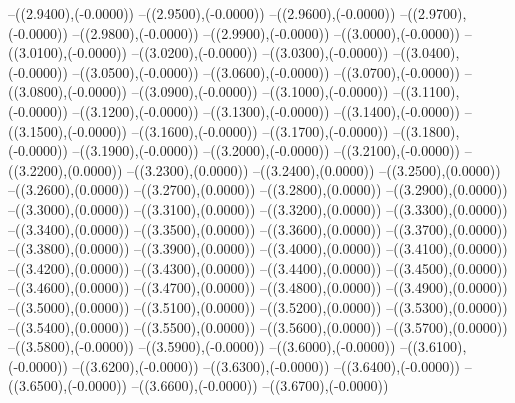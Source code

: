 {	--({\sx*(2.9400)},{\sy*(-0.0000)})
	--({\sx*(2.9500)},{\sy*(-0.0000)})
	--({\sx*(2.9600)},{\sy*(-0.0000)})
	--({\sx*(2.9700)},{\sy*(-0.0000)})
	--({\sx*(2.9800)},{\sy*(-0.0000)})
	--({\sx*(2.9900)},{\sy*(-0.0000)})
	--({\sx*(3.0000)},{\sy*(-0.0000)})
	--({\sx*(3.0100)},{\sy*(-0.0000)})
	--({\sx*(3.0200)},{\sy*(-0.0000)})
	--({\sx*(3.0300)},{\sy*(-0.0000)})
	--({\sx*(3.0400)},{\sy*(-0.0000)})
	--({\sx*(3.0500)},{\sy*(-0.0000)})
	--({\sx*(3.0600)},{\sy*(-0.0000)})
	--({\sx*(3.0700)},{\sy*(-0.0000)})
	--({\sx*(3.0800)},{\sy*(-0.0000)})
	--({\sx*(3.0900)},{\sy*(-0.0000)})
	--({\sx*(3.1000)},{\sy*(-0.0000)})
	--({\sx*(3.1100)},{\sy*(-0.0000)})
	--({\sx*(3.1200)},{\sy*(-0.0000)})
	--({\sx*(3.1300)},{\sy*(-0.0000)})
	--({\sx*(3.1400)},{\sy*(-0.0000)})
	--({\sx*(3.1500)},{\sy*(-0.0000)})
	--({\sx*(3.1600)},{\sy*(-0.0000)})
	--({\sx*(3.1700)},{\sy*(-0.0000)})
	--({\sx*(3.1800)},{\sy*(-0.0000)})
	--({\sx*(3.1900)},{\sy*(-0.0000)})
	--({\sx*(3.2000)},{\sy*(-0.0000)})
	--({\sx*(3.2100)},{\sy*(-0.0000)})
	--({\sx*(3.2200)},{\sy*(0.0000)})
	--({\sx*(3.2300)},{\sy*(0.0000)})
	--({\sx*(3.2400)},{\sy*(0.0000)})
	--({\sx*(3.2500)},{\sy*(0.0000)})
	--({\sx*(3.2600)},{\sy*(0.0000)})
	--({\sx*(3.2700)},{\sy*(0.0000)})
	--({\sx*(3.2800)},{\sy*(0.0000)})
	--({\sx*(3.2900)},{\sy*(0.0000)})
	--({\sx*(3.3000)},{\sy*(0.0000)})
	--({\sx*(3.3100)},{\sy*(0.0000)})
	--({\sx*(3.3200)},{\sy*(0.0000)})
	--({\sx*(3.3300)},{\sy*(0.0000)})
	--({\sx*(3.3400)},{\sy*(0.0000)})
	--({\sx*(3.3500)},{\sy*(0.0000)})
	--({\sx*(3.3600)},{\sy*(0.0000)})
	--({\sx*(3.3700)},{\sy*(0.0000)})
	--({\sx*(3.3800)},{\sy*(0.0000)})
	--({\sx*(3.3900)},{\sy*(0.0000)})
	--({\sx*(3.4000)},{\sy*(0.0000)})
	--({\sx*(3.4100)},{\sy*(0.0000)})
	--({\sx*(3.4200)},{\sy*(0.0000)})
	--({\sx*(3.4300)},{\sy*(0.0000)})
	--({\sx*(3.4400)},{\sy*(0.0000)})
	--({\sx*(3.4500)},{\sy*(0.0000)})
	--({\sx*(3.4600)},{\sy*(0.0000)})
	--({\sx*(3.4700)},{\sy*(0.0000)})
	--({\sx*(3.4800)},{\sy*(0.0000)})
	--({\sx*(3.4900)},{\sy*(0.0000)})
	--({\sx*(3.5000)},{\sy*(0.0000)})
	--({\sx*(3.5100)},{\sy*(0.0000)})
	--({\sx*(3.5200)},{\sy*(0.0000)})
	--({\sx*(3.5300)},{\sy*(0.0000)})
	--({\sx*(3.5400)},{\sy*(0.0000)})
	--({\sx*(3.5500)},{\sy*(0.0000)})
	--({\sx*(3.5600)},{\sy*(0.0000)})
	--({\sx*(3.5700)},{\sy*(0.0000)})
	--({\sx*(3.5800)},{\sy*(-0.0000)})
	--({\sx*(3.5900)},{\sy*(-0.0000)})
	--({\sx*(3.6000)},{\sy*(-0.0000)})
	--({\sx*(3.6100)},{\sy*(-0.0000)})
	--({\sx*(3.6200)},{\sy*(-0.0000)})
	--({\sx*(3.6300)},{\sy*(-0.0000)})
	--({\sx*(3.6400)},{\sy*(-0.0000)})
	--({\sx*(3.6500)},{\sy*(-0.0000)})
	--({\sx*(3.6600)},{\sy*(-0.0000)})
	--({\sx*(3.6700)},{\sy*(-0.0000)})
}
